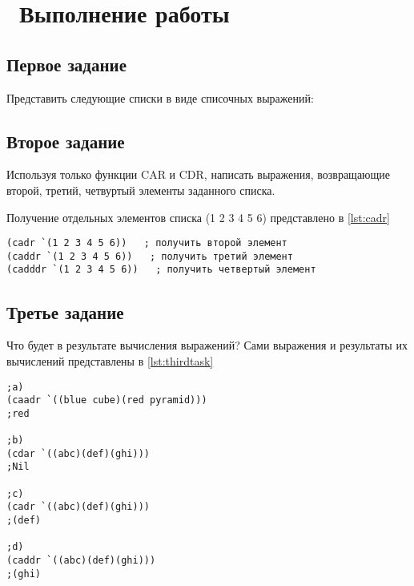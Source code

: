 \chapter{ Выполнение работы}
\label{cha:analysis}

\section{ Первое задание}
Представить следующие списки в виде списочных выражений:

\section{ Второе задание}
Используя только функции CAR и CDR, написать выражения, возвращающие второй, третий, четвуртый элементы заданного списка.

Получение отдельных элементов списка (1 2 3 4 5 6) представлено в \ref{lst:cadr}
\begin{lstlisting}[style=lispStyle, caption={Получение элементов списка с помощью команд car и cdr.},
                    label={lst:cadr}]
(cadr `(1 2 3 4 5 6))   ; получить второй элемент
(caddr `(1 2 3 4 5 6))   ; получить третий элемент
(cadddr `(1 2 3 4 5 6))   ; получить четвертый элемент
\end{lstlisting}

\section{ Третье задание}
Что будет в результате вычисления выражений?
Сами выражения и результаты их вычислений представлены в \ref{lst:thirdtask}
\begin{lstlisting}[style=lispStyle, caption={Получение элементов списка с помощью команд car и cdr.},
                    label={lst:thirdtask}]
;a)
(caadr `((blue cube)(red pyramid)))
;red

;b)
(cdar `((abc)(def)(ghi)))
;Nil

;c)
(cadr `((abc)(def)(ghi)))
;(def)

;d)
(caddr `((abc)(def)(ghi)))
;(ghi)
\end{lstlisting}
